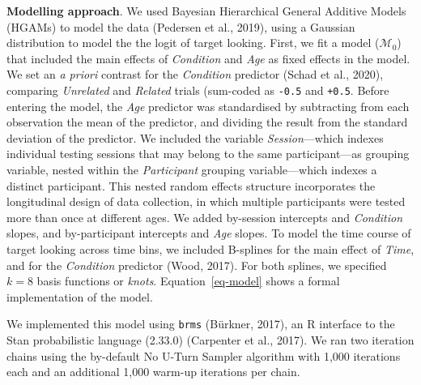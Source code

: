 \documentclass[
  12pt,
  b5paperpaper,
  twoside]{scrreprt}
\begin{document}
\textbf{Modelling approach}. We used Bayesian Hierarchical General
Additive Models (HGAMs) to model the data (Pedersen et al., 2019), using
a Gaussian distribution to model the the logit of target looking. First,
we fit a model (\(\mathcal{M}_0\)) that included the main effects of
\emph{Condition} and \emph{Age} as fixed effects in the model. We set an
\emph{a priori} contrast for the \emph{Condition} predictor (Schad et
al., 2020), comparing \emph{Unrelated} and \emph{Related} trials
(sum-coded as \texttt{-0.5} and \texttt{+0.5}. Before entering the
model, the \emph{Age} predictor was standardised by subtracting from
each observation the mean of the predictor, and dividing the result from
the standard deviation of the predictor. We included the variable
\emph{Session}---which indexes individual testing sessions that may
belong to the same participant---as grouping variable, nested within the
\emph{Participant} grouping variable---which indexes a distinct
participant. This nested random effects structure incorporates the
longitudinal design of data collection, in which multiple participants
were tested more than once at different ages. We added by-session
intercepts and \emph{Condition} slopes, and by-participant intercepts
and \emph{Age} slopes. To model the time course of target looking across
time bins, we included B-splines for the main effect of \emph{Time}, and
for the \emph{Condition} predictor (Wood, 2017). For both splines, we
specified \(k = 8\) basis functions or \emph{knots}.
Equation~\ref{eq-model} shows a formal implementation of the model.

We implemented this model using \texttt{brms} (Bürkner, 2017), an R
interface to the Stan probabilistic language (2.33.0) (Carpenter et al.,
2017). We ran two iteration chains using the by-default No U-Turn
Sampler algorithm with 1,000 iterations each and an additional 1,000
warm-up iterations per chain.

\newpage
\end{document}
